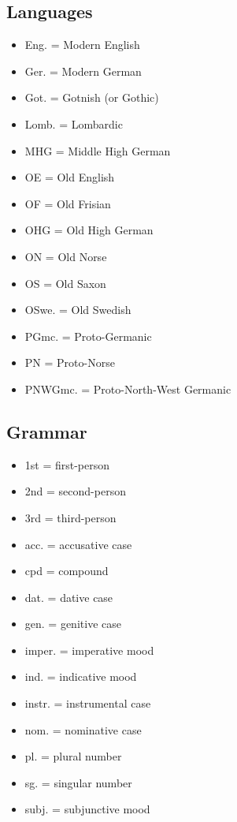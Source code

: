 \subsection{Languages}
\begin{itemize}%
	\item Eng. = Modern English
	\item Ger. = Modern German
	\item Got. = Gotnish (or Gothic)
	\item Lomb. = Lombardic
	\item MHG = Middle High German
	\item OE = Old English
	\item OF = Old Frisian
	\item OHG = Old High German
	\item ON = Old Norse
	\item OS = Old Saxon
	\item OSwe. = Old Swedish
	\item PGmc. = Proto-Germanic
	\item PN = Proto-Norse
	\item PNWGmc. = Proto-North-West Germanic
\end{itemize}

\subsection{Grammar}
\begin{itemize}%
	\item 1st = first-person
	\item 2nd = second-person
	\item 3rd = third-person
	\item acc. = accusative case
	\item cpd = compound
	\item dat. = dative case
	\item gen. = genitive case
	\item imper. = imperative mood
	\item ind. = indicative mood
	\item instr. = instrumental case
	\item nom. = nominative case
	\item pl. = plural number
	\item sg. = singular number
	\item subj. = subjunctive mood
\end{itemize}

